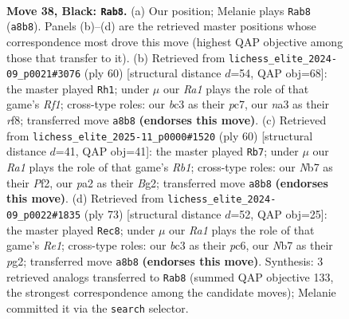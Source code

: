 \documentclass[11pt]{article}
\begin{document}
\clearpage

\begin{figure}[p]\centering
\begin{subfigure}{0.46\textwidth}\centering
\resizebox{\linewidth}{!}{%
\newchessgame
\chessboard[
  setfen={r1r3k1/pn3p2/1p2p1pp/8/2P4P/N1B1P3/PR2KPP1/7R b - - 0 38},
  showmover=false,
  pgfstyle=straightmove, color=movearrow, markmove={a8-b8}
]}
\caption{}
\end{subfigure}\hfill
\begin{subfigure}{0.46\textwidth}\centering
\resizebox{\linewidth}{!}{%
\newchessgame
\chessboard[
  setfen={5r2/2p3k1/1r2pp1p/p2p4/P2P2P1/2P1P3/1P3R2/2K2R2 w - - 2 31},
  showmover=false,
  pgfstyle=straightmove, color=movearrow, markmove={f1-h1}
]}
\caption{}
\end{subfigure}
\\[4pt]
\begin{subfigure}{0.46\textwidth}\centering
\resizebox{\linewidth}{!}{%
\newchessgame
\chessboard[
  setfen={2r3k1/3b1pp1/4p2p/r7/2pP4/p3P1P1/P4PBP/1RR3K1 w - - 0 31},
  showmover=false,
  pgfstyle=straightmove, color=movearrow, markmove={b1-b7}
]}
\caption{}
\end{subfigure}\hfill
\begin{subfigure}{0.46\textwidth}\centering
\resizebox{\linewidth}{!}{%
\newchessgame
\chessboard[
  setfen={r3r3/PRp2k2/2P3p1/5p1p/4p2P/8/1P3PP1/R5K1 b - - 2 37},
  showmover=false,
  pgfstyle=straightmove, color=movearrow, markmove={e8-c8}
]}
\caption{}
\end{subfigure}
\caption{\textbf{Move 38, Black: \texttt{Rab8}.} (a) Our position; Melanie plays \texttt{Rab8} (\texttt{a8b8}). Panels (b)--(d) are the retrieved master positions whose correspondence most drove this move (highest QAP objective among those that transfer to it). (b) Retrieved from \texttt{lichess\_elite\_2024-09\_p0021\#3076} (ply 60) [structural distance $d$=54, QAP obj=68]: the master played \texttt{Rh1}; under $\mu$ our \emph{Ra1} plays the role of that game's \emph{Rf1}; cross-type roles: our \emph{b}c3 as their \emph{p}c7, our \emph{n}a3 as their \emph{r}f8; transferred move \texttt{a8b8} \textbf{(endorses this move)}. (c) Retrieved from \texttt{lichess\_elite\_2025-11\_p0000\#1520} (ply 60) [structural distance $d$=41, QAP obj=41]: the master played \texttt{Rb7}; under $\mu$ our \emph{Ra1} plays the role of that game's \emph{Rb1}; cross-type roles: our \emph{N}b7 as their \emph{P}f2, our \emph{p}a2 as their \emph{B}g2; transferred move \texttt{a8b8} \textbf{(endorses this move)}. (d) Retrieved from \texttt{lichess\_elite\_2024-09\_p0022\#1835} (ply 73) [structural distance $d$=52, QAP obj=25]: the master played \texttt{Rec8}; under $\mu$ our \emph{Ra1} plays the role of that game's \emph{Re1}; cross-type roles: our \emph{b}c3 as their \emph{p}c6, our \emph{N}b7 as their \emph{p}g2; transferred move \texttt{a8b8} \textbf{(endorses this move)}. Synthesis: 3 retrieved analogs transferred to \texttt{Rab8} (summed QAP objective 133, the strongest correspondence among the candidate moves); Melanie committed it via the \texttt{search} selector.}
\label{fig:thought-m75}
\end{figure}
\end{document}
